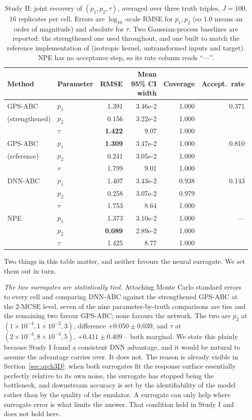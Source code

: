 \documentclass[sn-basic,iicol,pdflatex]{sn-jnl}
\begin{document}
\begin{table}[t]
\centering
\caption{Study II: joint recovery of $(p_1,p_2,\tau)$, averaged over three truth
triples, $J=100$, 16 replicates per cell. Errors are $\log_{10}$-scale RMSE for
$p_1,p_2$ (so $1.0$ means an order of magnitude) and absolute for $\tau$. Two
Gaussian-process baselines are reported: the strengthened one used throughout,
and one built to match the reference implementation of \citeauthor{lu2023}
(isotropic kernel, untransformed inputs and target). NPE has no acceptance
step, so its rate column reads ``---''.}
\label{tab:abc3D}
\begin{tabular}{llrrrr}
\toprule
Method & Parameter & RMSE & Mean 95\% CI width & Coverage & Accept.\ rate \\
\midrule
GPS-ABC & $p_1$   & 1.391 & 3.46e-2 & 1.000 & 0.371 \\
(strengthened) & $p_2$   & 0.156 & 3.22e-2 & 1.000 & \\
        & $\tau$  & \textbf{1.422} & 9.07 & 1.000 & \\
\midrule
GPS-ABC & $p_1$   & \textbf{1.309} & 3.47e-2 & 1.000 & 0.810 \\
(reference) & $p_2$   & 0.241 & 3.05e-2 & 1.000 & \\
        & $\tau$  & 1.799 & 9.01 & 1.000 & \\
\midrule
DNN-ABC & $p_1$   & 1.407 & 3.43e-2 & 0.938 & 0.143 \\
        & $p_2$   & 0.258 & 3.07e-2 & 0.979 & \\
        & $\tau$  & 1.753 & 8.64 & 1.000 & \\
\midrule
NPE & $p_1$   & 1.373 & 3.10e-2 & 1.000 & --- \\
        & $p_2$   & \textbf{0.089} & 2.89e-2 & 1.000 & \\
        & $\tau$  & 1.425 & 8.77 & 1.000 & \\
\bottomrule
\end{tabular}
\end{table}

Two things in this table matter, and neither favours the neural surrogate. We
set them out in turn.

\emph{The two surrogates are statistically tied.} Attaching Monte Carlo standard
errors to every cell and comparing DNN-ABC against the strengthened GPS-ABC at
the $2$-MCSE level, seven of the nine parameter-by-truth comparisons are ties
and the remaining two favour GPS-ABC; none favours the network. The two are
$p_2$ at $(1\times10^{-4}, 1\times10^{-2}, 3)$, difference
$+0.050 \pm 0.039$, and $\tau$ at
$(2\times10^{-3}, 8\times10^{-3}, 5)$, $+0.411 \pm 0.409$ -- both marginal.
We state this plainly because Study I found a consistent DNN advantage, and it
would be natural to assume the advantage carries over. It does not. The reason
is already visible in Section~\ref{sec:arch3D}: when both surrogates fit the
response surface essentially perfectly relative to its own noise, the surrogate
has stopped being the bottleneck, and downstream accuracy is set by the
identifiability of the model rather than by the quality of the emulator. A
surrogate can only help where surrogate error is what limits the answer. That
condition held in Study I and does not hold here.
\end{document}
